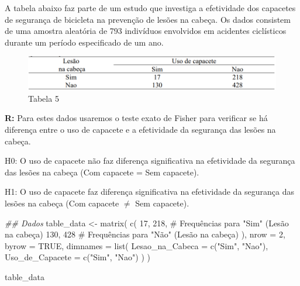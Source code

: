 \documentclass[
  letterpaper,
  DIV=11,
  numbers=noendperiod]{scrartcl}
\newenvironment{Shaded}{\begin{snugshade}}{\end{snugshade}}
\newcommand{\AttributeTok}[1]{\textcolor[rgb]{0.40,0.45,0.13}{#1}}
\newcommand{\CommentTok}[1]{\textcolor[rgb]{0.37,0.37,0.37}{#1}}
\newcommand{\ConstantTok}[1]{\textcolor[rgb]{0.56,0.35,0.01}{#1}}
\newcommand{\DecValTok}[1]{\textcolor[rgb]{0.68,0.00,0.00}{#1}}
\newcommand{\DocumentationTok}[1]{\textcolor[rgb]{0.37,0.37,0.37}{\textit{#1}}}
\newcommand{\FunctionTok}[1]{\textcolor[rgb]{0.28,0.35,0.67}{#1}}
\newcommand{\NormalTok}[1]{\textcolor[rgb]{0.00,0.23,0.31}{#1}}
\newcommand{\OtherTok}[1]{\textcolor[rgb]{0.00,0.23,0.31}{#1}}
\newcommand{\StringTok}[1]{\textcolor[rgb]{0.13,0.47,0.30}{#1}}
\begin{document}
A tabela abaixo faz parte de um estudo que investiga a efetividade dos
capacetes de segurança de bicicleta na prevenção de lesões na cabeça. Os
dados consistem de uma amostra aleatória de 793 indivíduos envolvidos em
acidentes ciclísticos durante um período especificado de um ano.

\begin{figure}[H]

{\centering \includegraphics{imgs/q5-tabela.png}

}

\caption{Tabela 5}

\end{figure}%

\textbf{R:} Para estes dados usaremos o teste exato de Fisher para
verificar se há diferença entre o uso de capacete e a efetividade da
segurança das lesões na cabeça.

H0: O uso de capacete não faz diferença significativa na efetividade da
segurança das lesões na cabeça (Com capacete = Sem capacete).

H1: O uso de capacete faz diferença significativa na efetividade da
segurança das lesões na cabeça (Com capacete \(\neq\) Sem capacete).

\begin{Shaded}
\begin{Highlighting}[]
\DocumentationTok{\#\# Dados}
\NormalTok{table\_data }\OtherTok{\textless{}{-}} \FunctionTok{matrix}\NormalTok{(}
  \FunctionTok{c}\NormalTok{(}
    \DecValTok{17}\NormalTok{, }\DecValTok{218}\NormalTok{,  }\CommentTok{\# Frequências para "Sim" (Lesão na cabeça)}
    \DecValTok{130}\NormalTok{, }\DecValTok{428}  \CommentTok{\# Frequências para "Não" (Lesão na cabeça)}
\NormalTok{  ),}
  \AttributeTok{nrow =} \DecValTok{2}\NormalTok{, }\AttributeTok{byrow =} \ConstantTok{TRUE}\NormalTok{,}
  \AttributeTok{dimnames =} \FunctionTok{list}\NormalTok{(}
    \AttributeTok{Lesao\_na\_Cabeca =} \FunctionTok{c}\NormalTok{(}\StringTok{"Sim"}\NormalTok{, }\StringTok{"Nao"}\NormalTok{),}
    \AttributeTok{Uso\_de\_Capacete =} \FunctionTok{c}\NormalTok{(}\StringTok{"Sim"}\NormalTok{, }\StringTok{"Nao"}\NormalTok{)}
\NormalTok{  )}
\NormalTok{)}

\NormalTok{table\_data}
\end{Highlighting}
\end{Shaded}
\end{document}
